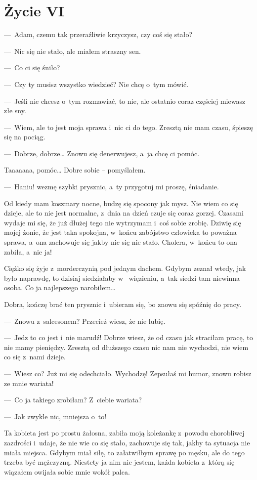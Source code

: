 \chapter{Życie VI}

---~Adam, czemu tak przeraźliwie krzyczysz, czy coś się stało?

---~Nic się nie stało, ale miałem straszny sen.

---~Co ci się śniło?

---~Czy ty musisz wszystko wiedzieć? Nie chcę o~tym mówić.

---~Jeśli nie chcesz o~tym rozmawiać, to nie, ale ostatnio coraz częściej miewasz złe sny.

---~Wiem, ale to jest moja sprawa i~nic ci do tego. Zresztą nie mam czasu, śpieszę się na pociąg.

---~Dobrze, dobrze… Znowu się denerwujesz, a~ja chcę ci pomóc.
 
Taaaaaaa, pomóc… Dobre sobie – pomyślałem.

---~Haniu! wezmę szybki prysznic, a~ty przygotuj mi proszę, śniadanie.

Od kiedy mam koszmary nocne, budzę się spocony jak mysz. Nie wiem co się dzieje, ale to nie jest normalne, z~dnia na 
dzień czuje się coraz gorzej. Czasami wydaje mi się, że już dłużej tego nie wytrzymam i~coś sobie zrobię. Dziwię się 
mojej żonie, że jest taka spokojna, w~końcu zabójstwo człowieka to poważna sprawa, a~ona zachowuje się jakby nic się 
nie stało. Cholera, w~końcu to ona zabiła, a~nie ja!
 
Ciężko się żyje z~morderczynią pod jednym dachem. Gdybym zeznał wtedy, jak było naprawdę, to dzisiaj siedziałaby w~
więzieniu, a~tak siedzi tam niewinna osoba. Co ja najlepszego narobiłem…
 
Dobra, kończę brać ten prysznic i~ubieram się, bo znowu się spóźnię do pracy.

---~Znowu z~salcesonem? Przecież wiesz, że nie lubię.

---~Jedz to co jest i~nie marudź! Dobrze wiesz, że od czasu jak straciłam pracę, to nie mamy pieniędzy. Zresztą od 
dłuższego czasu nic nam nie wychodzi, nie wiem co się z~nami dzieje.

---~Wiesz co? Już mi się odechciało. Wychodzę! Zepsułaś mi humor, znowu robisz ze mnie wariata!

---~Co ja takiego zrobiłam? Z~ciebie wariata?

---~Jak zwykle nic, mniejsza o~to!
 
Ta kobieta jest po prostu żałosna, zabiła moją koleżankę z~powodu chorobliwej zazdrości i~udaje, że nie wie co się 
stało, zachowuje się tak, jakby ta sytuacja nie miała miejsca. Gdybym miał siłę, to załatwiłbym sprawę po męsku, ale 
do tego trzeba być mężczyzną. Niestety ja nim nie jestem, każda kobieta z~którą się wiązałem owijała sobie mnie wokół 
palca.
 
